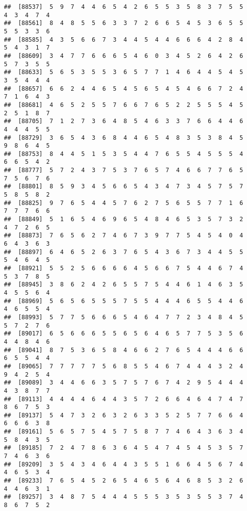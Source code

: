 \documentclass[
]{book}
\begin{document}
\begin{verbatim}
##  [88537]  5  9  7  4  4  6  5  4  2  6  5  5  3  5  8  3  7  5  5  4  3  4  7  4
##  [88561]  8  4  8  5  5  6  3  3  7  2  6  6  5  4  5  3  6  5  5  5  5  3  3  6
##  [88585]  4  3  5  6  6  7  3  4  4  5  4  4  6  6  6  4  2  8  4  5  4  3  1  7
##  [88609]  3  4  7  7  6  6  6  5  4  6  0  3  4  5  2  6  4  2  6  5  7  3  5  5
##  [88633]  5  6  5  3  5  5  3  6  5  7  7  1  4  6  4  4  5  4  5  3  5  4  4  4
##  [88657]  6  6  2  4  4  6  5  4  5  6  5  4  5  4  6  6  7  2  4  7  1  6  4  3
##  [88681]  4  6  5  2  5  5  7  6  6  7  6  5  2  2  5  5  5  4  5  2  5  1  8  7
##  [88705]  7  1  2  7  3  6  4  8  5  4  6  3  3  7  6  6  4  4  6  4  4  4  5  5
##  [88729]  3  6  5  4  3  6  8  4  4  6  5  4  8  3  5  3  8  4  5  9  8  6  4  5
##  [88753]  8  4  4  5  1  5  3  5  4  4  7  6  5  5  4  5  5  5  4  6  6  5  4  2
##  [88777]  5  7  2  4  3  7  5  3  7  6  5  7  4  6  6  7  7  6  5  7  5  6  7  6
##  [88801]  8  5  9  3  4  5  6  6  5  4  3  4  7  3  4  5  7  5  7  5  8  5  8  2
##  [88825]  9  7  6  5  4  4  5  7  6  2  7  5  6  5  5  7  7  1  6  7  7  7  6  6
##  [88849]  5  1  6  5  4  6  9  6  5  4  8  4  6  5  3  5  7  3  2  4  7  2  6  5
##  [88873]  7  6  5  6  2  7  4  6  7  3  9  7  7  5  4  5  4  0  4  6  4  3  6  3
##  [88897]  6  4  6  5  2  6  3  7  6  5  4  3  6  7  3  4  4  5  5  5  4  6  4  5
##  [88921]  5  5  2  5  6  6  6  6  4  5  6  6  7  5  4  4  6  7  4  5  3  7  8  5
##  [88945]  3  8  6  2  4  2  6  5  5  7  5  4  4  6  1  4  6  3  5  4  5  5  6  4
##  [88969]  5  6  5  6  5  5  5  7  5  5  4  4  4  6  5  5  4  4  6  4  6  5  5  4
##  [88993]  5  7  7  5  6  6  6  5  4  6  4  7  7  2  3  4  8  4  5  5  7  2  7  6
##  [89017]  6  5  6  6  6  5  5  6  5  6  4  6  5  7  7  5  3  5  6  4  4  8  4  6
##  [89041]  8  7  5  3  6  5  8  4  6  6  2  7  6  5  4  4  4  6  6  6  5  5  4  4
##  [89065]  7  7  7  7  7  5  6  8  5  5  4  6  7  4  4  4  3  2  4  9  4  2  5  4
##  [89089]  3  4  4  6  6  3  5  7  5  7  6  7  4  2  9  5  4  4  4  4  3  8  7  7
##  [89113]  4  4  4  4  6  4  4  3  5  7  2  6  6  4  6  4  7  4  7  8  6  7  5  3
##  [89137]  5  4  7  3  2  6  3  2  6  3  3  5  2  5  7  7  6  6  4  6  6  6  3  8
##  [89161]  5  6  5  7  5  4  5  7  5  8  7  7  4  6  4  3  6  3  4  5  8  4  3  5
##  [89185]  7  2  4  7  8  6  3  6  4  5  4  7  4  5  4  5  3  5  7  7  4  6  3  6
##  [89209]  3  5  4  3  4  6  4  4  3  5  5  1  6  6  4  5  6  7  4  4  6  5  3  4
##  [89233]  7  6  5  4  5  2  6  5  4  6  5  6  4  6  8  5  3  2  6  4  4  6  3  1
##  [89257]  3  4  8  7  5  4  4  4  5  5  5  3  5  3  5  5  3  7  4  8  6  7  5  2

\end{verbatim}
\end{document}
